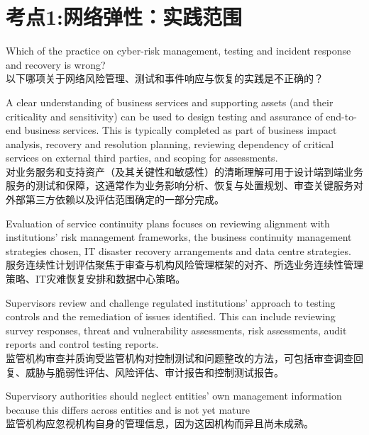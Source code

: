 \documentclass{article}
\newcounter{question} %
\begin{document}
 \tableofcontents %
\newpage




\section{考点1:网络弹性：实践范围}
\setcounter{question}{0}

\begin{question}
    Which of the practice on cyber-risk management, testing and incident response and recovery is wrong?
    \\以下哪项关于网络风险管理、测试和事件响应与恢复的实践是不正确的？
\end{question}

\begin{choices}
    \item A clear understanding of business services and supporting assets (and their criticality and sensitivity) can be used to design testing and assurance of end-to-end business services. This is typically completed as part of business impact analysis, recovery and resolution planning, reviewing dependency of critical services on external third parties, and scoping for assessments.\\
    对业务服务和支持资产（及其关键性和敏感性）的清晰理解可用于设计端到端业务服务的测试和保障，这通常作为业务影响分析、恢复与处置规划、审查关键服务对外部第三方依赖以及评估范围确定的一部分完成。
    \item Evaluation of service continuity plans focuses on reviewing alignment with institutions' risk management frameworks, the business continuity management strategies chosen, IT disaster recovery arrangements and data centre strategies.\\
    服务连续性计划评估聚焦于审查与机构风险管理框架的对齐、所选业务连续性管理策略、IT灾难恢复安排和数据中心策略。
    \item Supervisors review and challenge regulated institutions' approach to testing controls and the remediation of issues identified. This can include reviewing survey responses, threat and vulnerability assessments, risk assessments, audit reports and control testing reports.\\
    监管机构审查并质询受监管机构对控制测试和问题整改的方法，可包括审查调查回复、威胁与脆弱性评估、风险评估、审计报告和控制测试报告。
    \item Supervisory authorities should neglect entities’ own management information because this differs across entities and is not yet mature\\
    监管机构应忽视机构自身的管理信息，因为这因机构而异且尚未成熟。
\end{choices}
\end{document}
